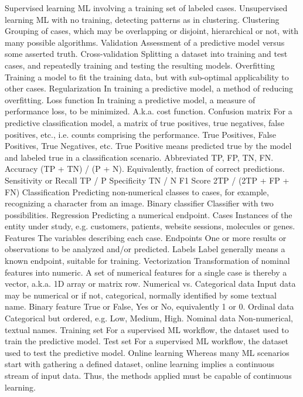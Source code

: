 \begin{appendices}
Supervised learning	ML involving a training set of labeled cases.
Unsupervised learning	ML with no training, detecting patterns as in clustering.
Clustering	Grouping of cases, which may be overlapping or disjoint, hierarchical or not, with many possible algorithms.
Validation	Assessment of a predictive model versus some asserted truth.
Cross-validation	Splitting a dataset into training and test cases, and repeatedly training and testing the resulting models.
Overfitting	Training a model to fit the training data, but with sub-optimal applicability to other cases.
Regularization	In training a predictive model, a method of reducing overfitting.
Loss function	In training a predictive model, a measure of performance loss, to be minimized.  A.k.a. cost function.
Confusion matrix	For a predictive classification model, a matrix of true positives, true negatives, false positives, etc., i.e. counts comprising the performance.
True Positives, False Positives, True Negatives, etc.	True Positive means predicted true by the model and labeled true in a classification scenario.  Abbreviated TP, FP, TN, FN.
Accuracy	(TP + TN) / (P + N).  Equivalently, fraction of correct predictions.
Sensitivity or Recall	TP / P
Specificity	TN / N
F1 Score	2TP / (2TP + FP + FN)
Classification	Predicting non-numerical classes to cases, for example, recognizing a character from an image.
Binary classifier	Classifier with two possibilities.
Regression	Predicting a numerical endpoint.
Cases	Instances of the entity under study, e.g. customers, patients, website sessions, molecules or genes.
Features	The variables describing each case.
Endpoints	One or more results or observations to be analyzed and/or predicted.
Labels	Label generally means a known endpoint, suitable for training.
Vectorization	Transformation of nominal features into numeric.  A set of numerical features for a single case is thereby a vector, a.k.a. 1D array or matrix row.
Numerical vs. Categorical data	Input data may be numerical or if not, categorical, normally identified by some textual name.
Binary feature	True or False, Yes or No, equivalently 1 or 0.
Ordinal data	Categorical but ordered, e.g. Low, Medium, High.
Nominal data	Non-numerical, textual names.
Training set	For a supervised ML workflow, the dataset used to train the predictive model.
Test set	For a supervised ML workflow, the dataset used to test the predictive model.
Online learning	Whereas many ML scenarios start with gathering a defined dataset, online learning implies a continuous stream of input data.  Thus, the methods applied must be capable of continuous learning.

\end{appendices}
